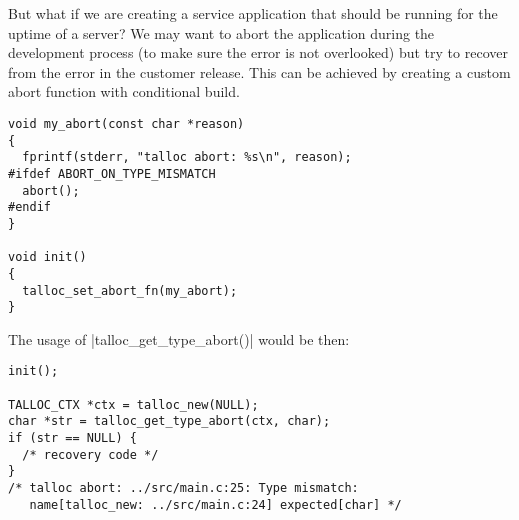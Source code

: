 \noindent
But what if we are creating a service application that should be running for the
uptime of a server? We may want to abort the application during the development
process (to make sure the error is not overlooked) but try to recover from the
error in the customer release. This can be achieved by creating a custom abort
function with conditional build.

\begin{lstlisting}[caption={Custom abort function}]
void my_abort(const char *reason)
{
  fprintf(stderr, "talloc abort: %s\n", reason);
#ifdef ABORT_ON_TYPE_MISMATCH
  abort();
#endif
}

void init()
{
  talloc_set_abort_fn(my_abort);
}
\end{lstlisting}

\noindent
The usage of |talloc_get_type_abort()| would be then:

\begin{lstlisting}[caption={Sample output}]
init();

TALLOC_CTX *ctx = talloc_new(NULL);
char *str = talloc_get_type_abort(ctx, char);
if (str == NULL) {
  /* recovery code */
}
/* talloc abort: ../src/main.c:25: Type mismatch: 
   name[talloc_new: ../src/main.c:24] expected[char] */
\end{lstlisting}

%
